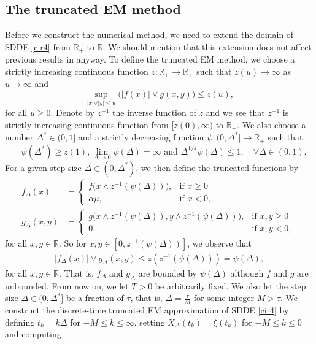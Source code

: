\documentclass[11pt]{article}
\begin{document}
\subsection{The truncated EM method}
Before we construct the numerical method,  we need to extend the domain of SDDE \eqref{cir4} from $\mathbb{R}_+$ to $\mathbb{R}$. We should mention that this extension does not affect previous results in anyway. To define the truncated EM method, we choose a strictly increasing continuous function $z:\mathbb{R}_+\rightarrow \mathbb{R}_+$ such that $z(u)\rightarrow\infty$ as $u\rightarrow \infty$ and 
\begin{equation}\label{sec4:eq:1}
\sup_{\vert x\vert\vee\vert y\vert \le u}\Big(|f(x)|\vee g(x,y)\Big)\le z(u), 
\end{equation}
for all $u\ge 0$. Denote by $z^{-1}$ the inverse function of $z$ and we see that $z^{-1}$ is strictly increasing continuous function from $[z(0),\infty)$ to $\mathbb{R}_+$. We also choose a number $\Delta^*\in (0,1]$ and a strictly decreasing function 
$\psi:(0,\Delta^*]\rightarrow \mathbb{R}_+$ such that
\begin{equation}\label{sec4:eq:2}
\quad \psi(\Delta^*)\ge z(1), \lim_{\Delta \rightarrow 0}\psi(\Delta)=\infty \text{ and } \Delta^{1/4}\psi(\Delta)\le 1, \quad \forall \Delta \in (0,1).
\end{equation}
For a given step size $\Delta \in (0,\Delta^*)$, we then define the truncated functions by
\begin{align*}  
f_{\Delta}(x)&=
\begin{cases}
  f\Big(x\wedge z^{-1}(\psi(\Delta))\Big), & \mbox{if $x\geq 0$ }\\
  \alpha\mu,                             & \mbox{if $x<0$},
\end{cases}
\\
g_{\Delta}(x,y)&=
\begin{cases}
  g\Big(x\wedge z^{-1}(\psi(\Delta)),y\wedge z^{-1}(\psi(\Delta))\Big), & \mbox{if $x,y\geq 0$ }\\
  0,                             & \mbox{if $x,y<0$},
\end{cases}
\end{align*}
for all $x,y\in \mathbb{R}$. So for $x,y\in[0,z^{-1}(\psi(\Delta))]$, we observe that
\begin{align}\label{sec4:eq:3}
|f_{\Delta}(x)|\vee g_{\Delta}(x,y)\le z(z^{-1}(\psi(\Delta)))=\psi(\Delta),
\end{align}
for all $x,y\in \mathbb{R}$. That is, $f_{\Delta}$ and $g_{\Delta}$ are bounded by $\psi(\Delta)$ although $f$ and $g$ are unbounded. From now on, we let $T > 0$ be arbitrarily fixed. We also let the step size $\Delta\in (0,\Delta^*]$ be a fraction of $\tau$, that is, $\Delta=\frac{\tau}{M}$ for some integer $M>\tau$. We construct the discrete-time truncated EM approximation of SDDE \eqref{cir4} by defining $t_k=k\Delta$ for $-M\le k\le\infty$, setting $X_{\Delta}(t_k)=\xi(t_k)$ for $-M\le k\le 0$ and computing 
\end{document}
